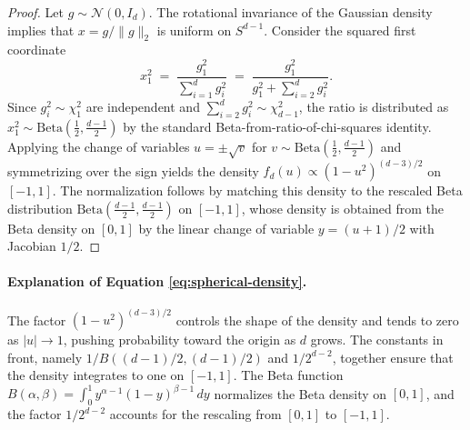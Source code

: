 \begin{proof}
Let $g \sim \mathcal{N}(0, I_d)$. The rotational invariance of the Gaussian
density implies that $x = g / \|g\|_2$ is uniform on $S^{d-1}$. Consider
the squared first coordinate
\begin{equation}
x_1^2 \;=\; \frac{g_1^2}{\sum_{i=1}^d g_i^2}
          \;=\; \frac{g_1^2}{g_1^2 + \sum_{i=2}^d g_i^2}.
\label{eq:sq-ratio}
\end{equation}
Since $g_i^2 \sim \chi^2_1$ are independent and
$\sum_{i=2}^d g_i^2 \sim \chi^2_{d-1}$, the ratio is distributed as
$x_1^2 \sim \mathrm{Beta}(\tfrac{1}{2}, \tfrac{d-1}{2})$ by the standard
Beta-from-ratio-of-chi-squares identity. Applying the change of variables
$u = \pm\sqrt{v}$ for $v \sim \mathrm{Beta}(\tfrac{1}{2}, \tfrac{d-1}{2})$
and symmetrizing over the sign yields the density
$f_d(u) \propto (1-u^2)^{(d-3)/2}$ on $[-1, 1]$. The normalization follows
by matching this density to the rescaled Beta distribution
$\mathrm{Beta}(\tfrac{d-1}{2}, \tfrac{d-1}{2})$ on $[-1, 1]$, whose density
is obtained from the Beta density on $[0, 1]$ by the linear change of
variable $y = (u+1)/2$ with Jacobian $1/2$.
\end{proof}

\paragraph{Explanation of Equation \ref{eq:spherical-density}.}
The factor $(1 - u^2)^{(d-3)/2}$ controls the shape of the density and tends
to zero as $|u| \to 1$, pushing probability toward the origin as $d$ grows.
The constants in front, namely $1 / B((d-1)/2, (d-1)/2)$ and $1 / 2^{d-2}$,
together ensure that the density integrates to one on $[-1, 1]$. The Beta
function
$B(\alpha, \beta) = \int_0^1 y^{\alpha-1}(1-y)^{\beta-1}\, dy$ normalizes the
Beta density on $[0, 1]$, and the factor $1 / 2^{d-2}$ accounts for the
rescaling from $[0, 1]$ to $[-1, 1]$.

